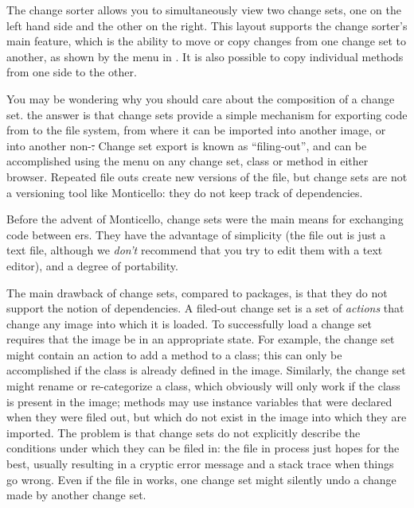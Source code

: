 \documentclass[a4paper,10pt,twoside]{book}
\begin{document}
The change sorter allows you to simultaneously view two change sets, one on the left hand side and the other on the right.
This layout supports the change sorter's main feature, which is the ability to move or copy changes from one change set to another, as shown by the \actclick menu in .
It is also possible to copy individual methods from one side to the other.

You may be wondering why you should care about the composition of a change set.
the answer is that change sets provide a simple mechanism for exporting code from \pharo to the file system, from where it can be imported into another \pharo image, or into another non-\pharo \st.
Change set export is known as ``filing-out'', and can be accomplished using the \actclick menu on any change set, class or method in either browser.
Repeated file outs create new versions of the file, but change sets are not a versioning tool like Monticello:
they do not keep track of dependencies.

Before the advent of Monticello, change sets were the main means for exchanging code between \pharo{}ers.
They have the advantage of simplicity (the file out is just a text file, although we \emph{don't} recommend that you try to edit them with a text editor), and a degree of portability.  

The main drawback of change sets, compared to  packages, is that they do not support the notion of dependencies.
A filed-out change set is a set of \emph{actions} that change any image into which it is loaded. To successfully load a change set requires that the image be in an appropriate state.
For example, the change set might contain an action to add a method to a class; this can only be accomplished if the class is already defined in the image.
Similarly, the change set might rename or re-categorize a class, which obviously will only work if the class is present in the image; methods may use instance variables that were declared when they were filed out, but which do not exist in the image into which they are imported.
The problem is that change sets do not explicitly describe the conditions under which they can be filed in:
the file in process just hopes for the best, usually resulting in a cryptic error message and a stack trace when things go wrong.
Even if the file in works, one change set might silently undo a change made by another change set.
\end{document}
